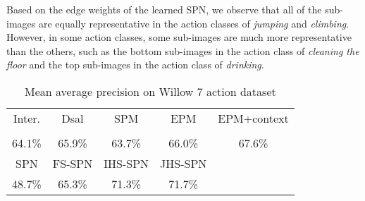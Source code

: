 \documentclass[journal]{IEEEtran}
\begin{document}
Based on the edge weights of the learned SPN, we observe that all of the sub-images are equally representative in the action classes of \textit{jumping} and \textit{climbing}. However, in some action classes, some sub-images are much more representative than the others, such as the bottom sub-images in the action class of \textit{cleaning the floor} and the top sub-images in the action class of \textit{drinking}.






\begin{table}[h!]
    \caption{Mean average precision on Willow 7 action dataset}   
    \begin{center}
        
        \begin{tabular}{c c c c c}
            \hline
            
            \hline
             Inter. & Dsal & SPM  & EPM  & EPM+context \\
            \cite{Delaitre11learningperson-object} & \cite{sharma:CVPR2012_Discriminative} & \cite{Lazebnik_beyond_cvpr2006} & \cite{sharma:CVPR2013} & \cite{sharma:CVPR2013}\\
        \hline
     64.1\% & 65.9\% & 63.7\% & 66.0\% & 67.6\%\\
			\hline
			\hline
			
			\hline
SPN & FS-SPN & IHS-SPN & JHS-SPN \\ \hline
48.7\% & 65.3\% & 71.3\% & 71.7\%\\ \hline  

 \hline
       \end{tabular}
        
    \end{center}
    
    
    
    \label{tab:willow_recognition_accuracy} 
\end{table}
\end{document}
